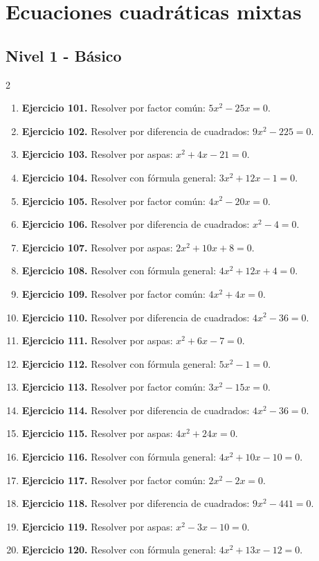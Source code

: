 \documentclass[10pt,a4paper]{article}
\newcommand{\nivel}[1]{\subsection*{#1}\addcontentsline{toc}{subsection}{#1}}
\begin{document}
\section{Ecuaciones cuadráticas mixtas}
\nivel{Nivel 1 - Básico}
\begin{multicols}{2}
\begin{enumerate}[label=\textbf{\arabic*.}]
\item \textbf{Ejercicio 101.} Resolver por factor común: \(5 x^{2} - 25 x=0\).
\item \textbf{Ejercicio 102.} Resolver por diferencia de cuadrados: \(9 x^{2} - 225=0\).
\item \textbf{Ejercicio 103.} Resolver por aspas: \(x^{2} + 4 x - 21=0\).
\item \textbf{Ejercicio 104.} Resolver con fórmula general: \(3 x^{2} + 12 x - 1=0\).
\item \textbf{Ejercicio 105.} Resolver por factor común: \(4 x^{2} - 20 x=0\).
\item \textbf{Ejercicio 106.} Resolver por diferencia de cuadrados: \(x^{2} - 4=0\).
\item \textbf{Ejercicio 107.} Resolver por aspas: \(2 x^{2} + 10 x + 8=0\).
\item \textbf{Ejercicio 108.} Resolver con fórmula general: \(4 x^{2} + 12 x + 4=0\).
\item \textbf{Ejercicio 109.} Resolver por factor común: \(4 x^{2} + 4 x=0\).
\item \textbf{Ejercicio 110.} Resolver por diferencia de cuadrados: \(4 x^{2} - 36=0\).
\item \textbf{Ejercicio 111.} Resolver por aspas: \(x^{2} + 6 x - 7=0\).
\item \textbf{Ejercicio 112.} Resolver con fórmula general: \(5 x^{2} - 1=0\).
\item \textbf{Ejercicio 113.} Resolver por factor común: \(3 x^{2} - 15 x=0\).
\item \textbf{Ejercicio 114.} Resolver por diferencia de cuadrados: \(4 x^{2} - 36=0\).
\item \textbf{Ejercicio 115.} Resolver por aspas: \(4 x^{2} + 24 x=0\).
\item \textbf{Ejercicio 116.} Resolver con fórmula general: \(4 x^{2} + 10 x - 10=0\).
\item \textbf{Ejercicio 117.} Resolver por factor común: \(2 x^{2} - 2 x=0\).
\item \textbf{Ejercicio 118.} Resolver por diferencia de cuadrados: \(9 x^{2} - 441=0\).
\item \textbf{Ejercicio 119.} Resolver por aspas: \(x^{2} - 3 x - 10=0\).
\item \textbf{Ejercicio 120.} Resolver con fórmula general: \(4 x^{2} + 13 x - 12=0\).
\end{enumerate}
\end{multicols}
\end{document}
